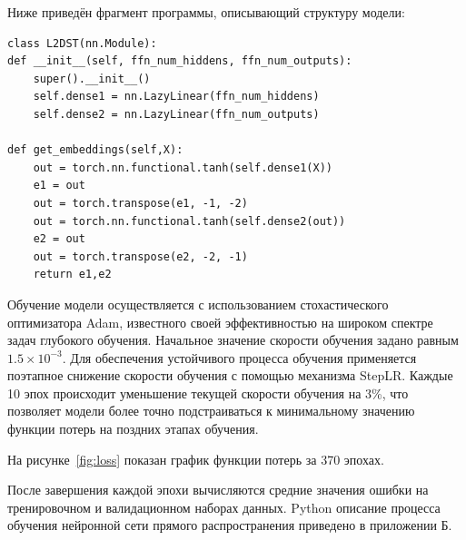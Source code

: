 Ниже приведён фрагмент программы, описывающий структуру модели:
 
\small
\fontsize{12pt}{12pt}\selectfont
\begin{verbatim}
class L2DST(nn.Module):
def __init__(self, ffn_num_hiddens, ffn_num_outputs):
    super().__init__()
    self.dense1 = nn.LazyLinear(ffn_num_hiddens)
    self.dense2 = nn.LazyLinear(ffn_num_outputs)

def get_embeddings(self,X):
    out = torch.nn.functional.tanh(self.dense1(X))
    e1 = out
    out = torch.transpose(e1, -1, -2)
    out = torch.nn.functional.tanh(self.dense2(out))
    e2 = out
    out = torch.transpose(e2, -2, -1)
    return e1,e2
\end{verbatim}
\normalsize
\fontsize{14pt}{14pt}\selectfont

Обучение модели осуществляется с использованием стохастического оптимизатора 
Adam, известного своей эффективностью на широком спектре задач глубокого 
обучения. Начальное значение скорости обучения задано равным 
\(1.5\times10^{-3}\).
Для обеспечения устойчивого процесса обучения применяется поэтапное снижение 
скорости обучения с помощью механизма StepLR. Каждые 10 эпох происходит 
уменьшение текущей скорости обучения на 3\%, что позволяет модели более точно 
подстраиваться к минимальному значению функции потерь на поздних этапах 
обучения.

На рисунке~\ref{fig:loss} показан график функции потерь за 370 эпохах.


После завершения каждой эпохи вычисляются средние значения ошибки на 
тренировочном и валидационном наборах данных.  
Python описание процесса обучения нейронной сети прямого распространения 
приведено в приложении Б.